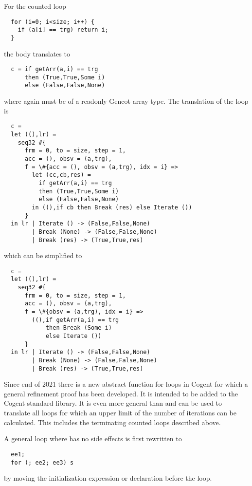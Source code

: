 For the counted loop
\begin{verbatim}
  for (i=0; i<size; i++) { 
    if (a[i] == trg) return i;
  }
\end{verbatim}
the body translates to 
\begin{verbatim}
  c = if getArr(a,i) == trg 
      then (True,True,Some i)
      else (False,False,None)
\end{verbatim}
where again  must be of a readonly Gencot array type. The translation of the loop is
\begin{verbatim}
  c = 
  let ((),lr) = 
    seq32 #{
      frm = 0, to = size, step = 1, 
      acc = (), obsv = (a,trg), 
      f = \#{acc = (), obsv = (a,trg), idx = i} => 
        let (cc,cb,res) =
          if getArr(a,i) == trg 
          then (True,True,Some i)
          else (False,False,None)
        in ((),if cb then Break (res) else Iterate ())
      }
  in lr | Iterate () -> (False,False,None)
        | Break (None) -> (False,False,None)
        | Break (res) -> (True,True,res)
\end{verbatim}
which can be simplified to
\begin{verbatim}
  c = 
  let ((),lr) = 
    seq32 #{
      frm = 0, to = size, step = 1, 
      acc = (), obsv = (a,trg), 
      f = \#{obsv = (a,trg), idx = i} => 
        ((),if getArr(a,i) == trg 
            then Break (Some i) 
            else Iterate ())
      }
  in lr | Iterate () -> (False,False,None)
        | Break (None) -> (False,False,None)
        | Break (res) -> (True,True,res)
\end{verbatim}

Since end of 2021 there is a new abstract function  for loops in Cogent for which a general refinement proof 
has been developed. It is intended to be added to the Cogent standard library. It is even more general than  
and can be used to translate all  loops for which an upper limit of the number of iterations can be calculated.
This includes the terminating counted  loops described above.

A general  loop  where  has no side effects is first rewritten to 
\begin{verbatim}
  ee1;
  for (; ee2; ee3) s
\end{verbatim}
by moving the initialization expression or declaration before the loop.

